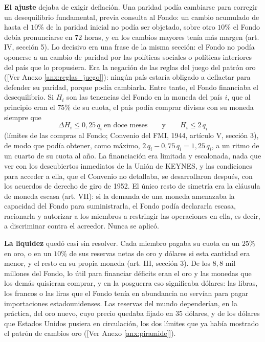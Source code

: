 \documentclass[10pt,a4paper]{article}
\newcommand{\authorfont}[1]{{\fontfamily{EBGaramond-TLF}\selectfont #1}}
\begin{document}
\textbf{El ajuste} dejaba de exigir deflación. Una paridad podía cambiarse para corregir un desequilibrio fundamental, previa consulta al Fondo: un cambio acumulado de hasta el $10\%$ de la paridad inicial no podía ser objetado, sobre otro $10\%$ el Fondo debía pronunciarse en $72$ horas, y en los cambios mayores tenía más margen (art. IV, sección 5). Lo decisivo era una frase de la misma sección: el Fondo no podía oponerse a un cambio de paridad por las políticas sociales o políticas interiores del país que lo propusiera. Era la negación de las reglas del juego del patrón oro ([\authorfont{Ver Anexo \ref{anx:reglas_juego}}]): ningún país estaría obligado a deflactar para defender su paridad, porque podía cambiarla. Entre tanto, el Fondo financiaba el desequilibrio. Si $H_i$ son las tenencias del Fondo en la moneda del país $i$, que al principio eran el $75\%$ de su cuota, el país podía comprar divisas con su moneda siempre que
$$\Delta H_i \leq 0{,}25\,q_i \ \text{en doce meses} \qquad\text{y}\qquad H_i\leq 2\,q_i$$
(límites de las compras al Fondo; Convenio del FMI, 1944, artículo V, sección 3), de modo que podía obtener, como máximo, $2\,q_i-0{,}75\,q_i=1{,}25\,q_i$, a un ritmo de un cuarto de su cuota al año. La financiación era limitada y escalonada, nada que ver con los descubiertos inmediatos de la Unión de KEYNES, y las condiciones para acceder a ella, que el Convenio no detallaba, se desarrollaron después, con los acuerdos de derecho de giro de 1952. El único resto de simetría era la cláusula de moneda escasa (art. VII): si la demanda de una moneda amenazaba la capacidad del Fondo para suministrarla, el Fondo podía declararla escasa, racionarla y autorizar a los miembros a restringir las operaciones en ella, es decir, a discriminar contra el acreedor. Nunca se aplicó.

\textbf{La liquidez} quedó casi sin resolver. Cada miembro pagaba su cuota en un $25\%$ en oro, o en un $10\%$ de sus reservas netas de oro y dólares si esta cantidad era menor, y el resto en su propia moneda (art. III, sección 3). De los $8{,}8$ mil millones del Fondo, lo útil para financiar déficits eran el oro y las monedas que los demás quisieran comprar, y en la posguerra eso significaba dólares: las libras, los francos o las liras que el Fondo tenía en abundancia no servían para pagar importaciones estadounidenses. Las reservas del mundo dependerían, en la práctica, del oro nuevo, cuyo precio quedaba fijado en $35$ dólares, y de los dólares que Estados Unidos pusiera en circulación, los dos límites que ya había mostrado el patrón de cambios oro ([\authorfont{Ver Anexo \ref{anx:piramide}}]).
\end{document}

